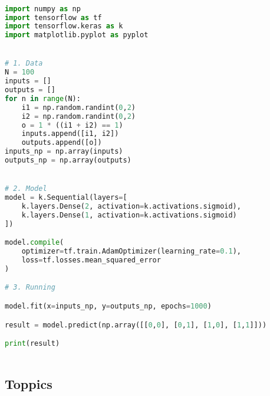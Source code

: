 \begin{lstlisting}[language=python]

import numpy as np
import tensorflow as tf
import tensorflow.keras as k
import matplotlib.pyplot as pyplot


# 1. Data
N = 100
inputs = []
outputs = []
for n in range(N):
    i1 = np.random.randint(0,2)
    i2 = np.random.randint(0,2)
    o = 1 * ((i1 + i2) == 1)
    inputs.append([i1, i2])
    outputs.append([o])
inputs_np = np.array(inputs)
outputs_np = np.array(outputs)


# 2. Model
model = k.Sequential(layers=[
    k.layers.Dense(2, activation=k.activations.sigmoid),
    k.layers.Dense(1, activation=k.activations.sigmoid)
])

model.compile(
    optimizer=tf.train.AdamOptimizer(learning_rate=0.1),
    loss=tf.losses.mean_squared_error
)

# 3. Running

model.fit(x=inputs_np, y=outputs_np, epochs=1000)

result = model.predict(np.array([[0,0], [0,1], [1,0], [1,1]]))

print(result)



\end{lstlisting}


\subsection{Toppics}


